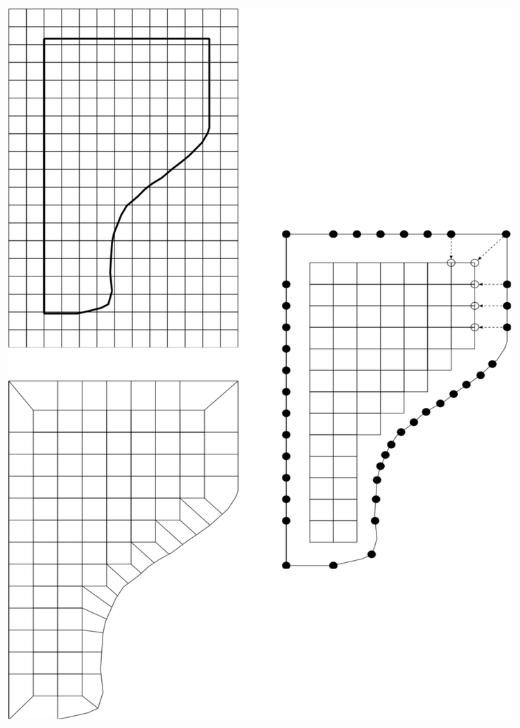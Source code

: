 \documentclass[compress,10pt,aspectratio=169]{beamer}
\begin{document}
\begin{frame}
\begin{columns}
\begin{column}{0.4\textwidth}
{    \includegraphics[scale=0.28]{images/superpo_grid_1_beam.pdf}
\vspace{0.18cm}
}
\end{column}
\end{columns}
\end{frame}
\end{document}
